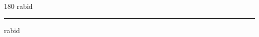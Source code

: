 
\begin{frame}
\begin{center}
\begin{turn}{180}
{\fontsize{2.5cm}{1em}\selectfont rabid}
\end{turn}
\vspace{1em}\par  
\hrule
\vspace{1em}\par  
{\fontsize{2.5cm}{1em}\selectfont rabid}
\end{center}
\end{frame}
